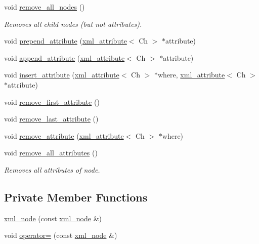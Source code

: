 \begin{DoxyCompactItemize}
void \mbox{\hyperlink{classrapidxml_1_1xml__node_a95735358b079ae0adcfbbac69aa1fbc3}{remove\+\_\+all\+\_\+nodes}} ()
\begin{DoxyCompactList}\small\item\em Removes all child nodes (but not attributes). \end{DoxyCompactList}\item 
void \mbox{\hyperlink{classrapidxml_1_1xml__node_a8b62ee76489faf8e2d1210869d547684}{prepend\+\_\+attribute}} (\mbox{\hyperlink{classrapidxml_1_1xml__attribute}{xml\+\_\+attribute}}$<$ Ch $>$ $\ast$attribute)
\item 
void \mbox{\hyperlink{classrapidxml_1_1xml__node_a33ce3386f8c42dd4db658b75cbb6e6c4}{append\+\_\+attribute}} (\mbox{\hyperlink{classrapidxml_1_1xml__attribute}{xml\+\_\+attribute}}$<$ Ch $>$ $\ast$attribute)
\item 
void \mbox{\hyperlink{classrapidxml_1_1xml__node_a9fe659cdf4a5b3bbf5e8ffc98db5a84f}{insert\+\_\+attribute}} (\mbox{\hyperlink{classrapidxml_1_1xml__attribute}{xml\+\_\+attribute}}$<$ Ch $>$ $\ast$where, \mbox{\hyperlink{classrapidxml_1_1xml__attribute}{xml\+\_\+attribute}}$<$ Ch $>$ $\ast$attribute)
\item 
void \mbox{\hyperlink{classrapidxml_1_1xml__node_aa95192d2a165cca16c551ed2a2a06aec}{remove\+\_\+first\+\_\+attribute}} ()
\item 
void \mbox{\hyperlink{classrapidxml_1_1xml__node_a1781a2cbedc9a51d609ad5b528125635}{remove\+\_\+last\+\_\+attribute}} ()
\item 
void \mbox{\hyperlink{classrapidxml_1_1xml__node_a6f97b1b4f46a94a4587915df3c0c6b57}{remove\+\_\+attribute}} (\mbox{\hyperlink{classrapidxml_1_1xml__attribute}{xml\+\_\+attribute}}$<$ Ch $>$ $\ast$where)
\item 
void \mbox{\hyperlink{classrapidxml_1_1xml__node_aa8d5d9484aa1eb5ff1841a073c84c1aa}{remove\+\_\+all\+\_\+attributes}} ()
\begin{DoxyCompactList}\small\item\em Removes all attributes of node. \end{DoxyCompactList}\end{DoxyCompactItemize}
\subsection*{Private Member Functions}
\begin{DoxyCompactItemize}
\item 
\mbox{\hyperlink{classrapidxml_1_1xml__node_af5f365f98059708e7180c0fbcf1412c5}{xml\+\_\+node}} (const \mbox{\hyperlink{classrapidxml_1_1xml__node}{xml\+\_\+node}} \&)
\item 
void \mbox{\hyperlink{classrapidxml_1_1xml__node_aa9320e2dd58cfbe5fe4b43b9f0d8c788}{operator=}} (const \mbox{\hyperlink{classrapidxml_1_1xml__node}{xml\+\_\+node}} \&)
\end{DoxyCompactItemize}

